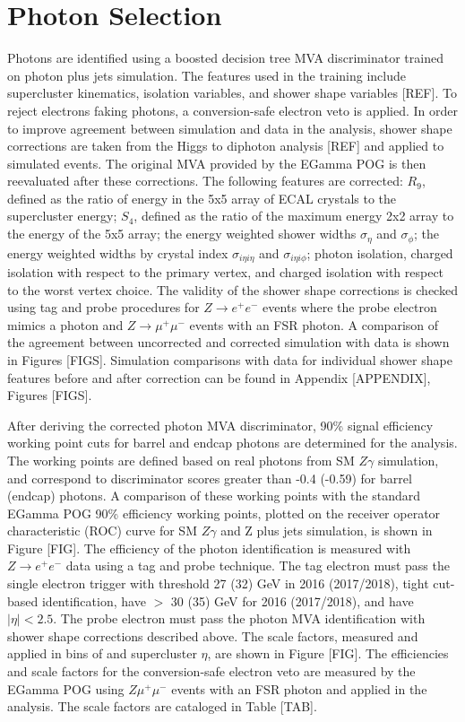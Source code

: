 \section{Photon Selection}
Photons are identified using a boosted decision tree MVA discriminator trained on photon plus jets simulation. The features used in the 
training include supercluster kinematics, isolation variables, and shower shape variables [REF]. To reject electrons faking photons, 
a conversion-safe electron veto is applied. In order to improve agreement between simulation and data in the \hzg analysis, shower 
shape corrections are taken from the Higgs to diphoton analysis [REF] and applied to simulated events. The original MVA provided by the 
EGamma POG is then reevaluated after these corrections. The following features are corrected: $R_{9}$, defined as the ratio of energy in
the 5x5 array of ECAL crystals to the supercluster energy; $S_{4}$, defined as the ratio of the maximum energy 2x2 array to the energy of 
the 5x5 array; the energy weighted shower widths $\sigma_{\eta}$ and $\sigma_{\phi}$; the energy weighted widths by crystal index 
$\sigma_{i\eta i\eta}$ and $\sigma_{i\eta i\phi}$; photon isolation, charged isolation with respect to the primary vertex, 
and charged isolation with respect to the worst vertex choice. The validity of the shower shape corrections is checked using tag 
and probe procedures for $Z\rightarrow e^{+}e^{-}$ events where the probe electron mimics a photon and $Z\rightarrow \mu^{+}\mu^{-}$
events with an FSR photon. A comparison of the agreement between uncorrected and corrected simulation with data is shown in 
Figures [FIGS]. Simulation comparisons with data for individual shower shape features before and after correction can be found 
in Appendix [APPENDIX], Figures [FIGS]. 

After deriving the corrected photon MVA discriminator, 90\% signal efficiency working point cuts for barrel and endcap photons 
are determined for the \hzg analysis. The working points are defined based on real photons from SM $Z\gamma$ simulation, and correspond 
to discriminator scores greater than -0.4 (-0.59) for barrel (endcap) photons. A comparison of these working points with the standard 
EGamma POG 90\% efficiency working points, plotted on the receiver operator characteristic (ROC) curve for SM $Z\gamma$ and Z plus jets 
simulation, is shown in Figure [FIG]. The efficiency of the photon identification is measured with $Z\rightarrow e^{+}e^{-}$ data
using a tag and probe technique. The tag electron must pass the single electron trigger with \pt threshold 27 (32) GeV in 
2016 (2017/2018), tight cut-based identification, have \pt $>$ 30 (35) GeV for 2016 (2017/2018), and have $|\eta| < 2.5$. The 
probe electron must pass the photon MVA identification with shower shape corrections described above. The scale factors, measured and 
applied in bins of \pt and supercluster $\eta$, are shown in Figure [FIG]. The efficiencies and scale factors for the conversion-safe 
electron veto are measured by the EGamma POG using $Z\mu^{+}\mu^{-}$ events with an FSR photon and applied in the \hzg analysis. 
The scale factors are cataloged in Table [TAB]. 

